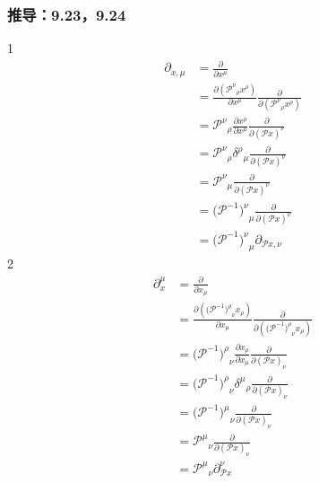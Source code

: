 \subsubsection{推导：9.23，9.24}
1
\begin{equation}
    \begin{aligned}
        \partial _{x,\mu}&=\frac{\partial}{\partial x^{\mu}}
\\
&=\frac{\partial \left( {\mathcal{P} ^{\nu}}_{\rho}x^{\rho} \right)}{\partial x^{\mu}}\frac{\partial}{\partial \left( {\mathcal{P} ^{\nu}}_{\rho}x^{\rho} \right)}
\\
&={\mathcal{P} ^{\nu}}_{\rho}\frac{\partial x^{\rho}}{\partial x^{\mu}}\frac{\partial}{\partial (\mathcal{P} x)^{\nu}}
\\
&={\mathcal{P} ^{\nu}}_{\rho}{\delta ^{\rho}}_{\mu}\frac{\partial}{\partial (\mathcal{P} x)^{\nu}}
\\
&={\mathcal{P} ^{\nu}}_{\mu}\frac{\partial}{\partial (\mathcal{P} x)^{\nu}}
\\
&=(\mathcal{P} ^{-1}{)^{\nu}}_{\mu}\frac{\partial}{\partial (\mathcal{P} x)^{\nu}}
\\
&=(\mathcal{P} ^{-1}{)^{\nu}}_{\mu}\partial _{\mathcal{P} x,\nu}
    \end{aligned}
\end{equation}
2
\begin{equation}
    \begin{aligned}
        \partial _{x}^{\mu}&=\frac{\partial}{\partial x_{\mu}}
\\
&=\frac{\partial \left( (\mathcal{P} ^{-1}{)^{\rho}}_{\nu}x_{\rho} \right)}{\partial x_{\mu}}\frac{\partial}{\partial \left( (\mathcal{P} ^{-1}{)^{\rho}}_{\nu}x_{\rho} \right)}
\\
&=(\mathcal{P} ^{-1}{)^{\rho}}_{\nu}\frac{\partial x_{\rho}}{\partial x_{\mu}}\frac{\partial}{\partial (\mathcal{P} x)_{\nu}}
\\
&=(\mathcal{P} ^{-1}{)^{\rho}}_{\nu}{\delta ^{\mu}}_{\rho}\frac{\partial}{\partial (\mathcal{P} x)_{\nu}}
\\
&=(\mathcal{P} ^{-1}{)^{\mu}}_{\nu}\frac{\partial}{\partial (\mathcal{P} x)_{\nu}}
\\
&={\mathcal{P} ^{\mu}}_{\nu}\frac{\partial}{\partial (\mathcal{P} x)_{\nu}}
\\
&={\mathcal{P} ^{\mu}}_{\nu}\partial _{\mathcal{P} x}^{\nu}
    \end{aligned}
\end{equation}



